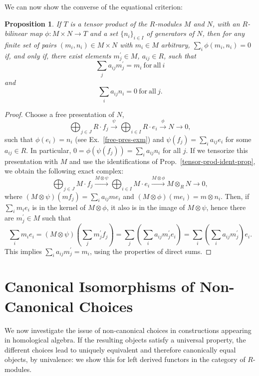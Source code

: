 \documentclass{amsart}
\theoremstyle{plain}
\numberwithin{equation}{section} %
\numberwithin{figure}{section} %
\theoremstyle{plain}
\theoremstyle{plain}
\theoremstyle{plain}
\theoremstyle{plain}
\theoremstyle{plain}
\newtheorem{prop}[thm]{Proposition} %
\theoremstyle{plain}
\theoremstyle{remark}
\theoremstyle{remark}
\theoremstyle{remark}
\begin{document}
We can now show the converse of the equational criterion:
\begin{prop} \label{tensor-eq-crit-prop}
If $T$ is a tensor product of the $R$-modules $M$ and $N$, with an $R$-bilinear map $\phi : M \times N \rightarrow T$ and a set $\{n_i\}_{i \in I}$ of generators of $N$, then for any finite set of pairs $(m_i, n_i) \in M \times N$ with $m_i \in M$ arbitrary, $\sum_i \phi(m_i, n_i) = 0$ if, and only if, there exist elements $m_j^\prime \in M$, $a_{ij} \in R$, such that
\[ \sum_j a_{ij}m_j^\prime = m_i\ \mathrm{for\ all\ } i \]
and
\[ \sum_i a_{ij}n_i = 0\ \mathrm{for\ all\ } j. \] 
\end{prop}
\begin{proof}
Choose a free presentation of $N$, 
\[ \bigoplus_{j \in J} R \cdot f_j \stackrel{\psi}{\rightarrow}  
   \bigoplus_{i \in I} R \cdot e_i \stackrel{\phi}{\rightarrow} N \rightarrow 0, \]
such that $\phi(e_i) = n_i$ (see Ex.~\ref{free-pres-exm}) and $\psi(f_j) = \sum_{i} a_{ij}e_i$ for some $a_{ij} \in R$. In particular, $0 = \phi(\psi(f_j)) = \sum_{i} a_{ij}n_i$ for all $j$. If we tensorize this presentation with $M$ and use the identifications of Prop.~\ref{tensor-prod-ident-prop}, we obtain the following exact complex:
\[ \bigoplus_{j \in J} M \cdot f_j \stackrel{M \otimes \psi}{\longrightarrow}  
   \bigoplus_{i \in I} M \cdot e_i \stackrel{M \otimes \phi}{\longrightarrow} M \otimes_R N \rightarrow 0, \]
where $(M \otimes \psi)(mf_j) = \sum_i a_{ij} me_i$ and $(M \otimes \phi)(me_i) = m \otimes n_i$. Then, if $\sum_i m_ie_i$ is in the kernel of $M \otimes \phi$, it also is in the image of $M \otimes \psi$, hence there are $m_j^\prime \in M$ such that
\[ \sum_i m_ie_i = (M \otimes \psi)(\sum_j m_j^\prime f_j) = 
    \sum_j \left( \sum_i a_{ij} m_j^\prime e_i \right) = \sum_i \left( \sum_i a_{ij} m_j^\prime \right) e_i. \]
This implies $\sum_i a_{ij} m_j^\prime = m_i$, using the properties of direct sums.  
\end{proof}


\section{Canonical Isomorphisms of Non-Canonical Choices} \label{choice-sec}

We now investigate the issue of non-canonical choices in constructions appearing in homological algebra. If the resulting objects satisfy a universal property, the different choices lead to uniquely equivalent and therefore canonically equal objects, by univalence: we show this for left derived functors in the category of $R$-modules.
\end{document}
